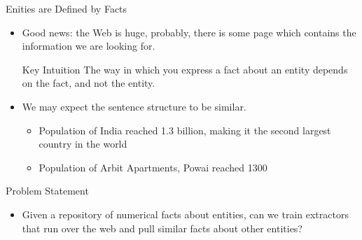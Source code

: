 \documentclass{beamer}
\begin{document}
\begin{frame}{Enities are Defined by Facts}

\begin{itemize}
 \item  Good news: the Web is huge, probably, there is some page which contains the information we are looking for. 
 \begin{block}{Key Intuition}
 The way in which you express a fact about an entity depends on the fact, and not the entity. 
 \end{block}
 \item We may expect the sentence structure to be similar. 
 \begin{itemize}
    \item Population of India reached 1.3 billion, making it the second largest country in the world
    \item Population of Arbit Apartments, Powai reached 1300
 \end{itemize}
 
\end{itemize}
\end{frame}

\begin{frame}{Problem Statement}
 
 \begin{itemize}
  \item Given a repository of numerical facts about entities, can we train extractors that run over the web and pull similar facts about other entities?
 \end{itemize}

 
\end{frame}
\end{document}
